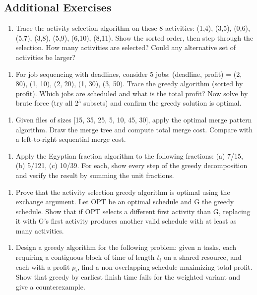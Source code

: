 \subsection{Additional Exercises}

\begin{enumerate}
\item Trace the activity selection algorithm on these 8 activities: (1,4), (3,5), (0,6), (5,7), (3,8), (5,9), (6,10), (8,11). Show the sorted order, then step through the selection. How many activities are selected? Could any alternative set of activities be larger?
\end{enumerate}

\begin{enumerate}
\item For job sequencing with deadlines, consider 5 jobs: (deadline, profit) = (2, 80), (1, 10), (2, 20), (1, 30), (3, 50). Trace the greedy algorithm (sorted by profit). Which jobs are scheduled and what is the total profit? Now solve by brute force (try all 2$^{5}$ subsets) and confirm the greedy solution is optimal.
\end{enumerate}

\begin{enumerate}
\item Given files of sizes [15, 35, 25, 5, 10, 45, 30], apply the optimal merge pattern algorithm. Draw the merge tree and compute total merge cost. Compare with a left-to-right sequential merge cost.
\end{enumerate}

\begin{enumerate}
\item Apply the Egyptian fraction algorithm to the following fractions: (a) 7/15, (b) 5/121, (c) 10/39. For each, show every step of the greedy decomposition and verify the result by summing the unit fractions.
\end{enumerate}

\begin{enumerate}
\item Prove that the activity selection greedy algorithm is optimal using the exchange argument. Let OPT be an optimal schedule and G the greedy schedule. Show that if OPT selects a different first activity than G, replacing it with G's first activity produces another valid schedule with at least as many activities.
\end{enumerate}

\begin{enumerate}
\item Design a greedy algorithm for the following problem: given n tasks, each requiring a contiguous block of time of length $t_i$ on a shared resource, and each with a profit $p_i$, find a non-overlapping schedule maximizing total profit. Show that greedy by earliest finish time fails for the weighted variant and give a counterexample.
\end{enumerate}

